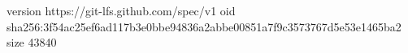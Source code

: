 version https://git-lfs.github.com/spec/v1
oid sha256:3f54ac25ef6ad117b3e0bbe94836a2abbe00851a7f9c3573767d5e53e1465ba2
size 43840
